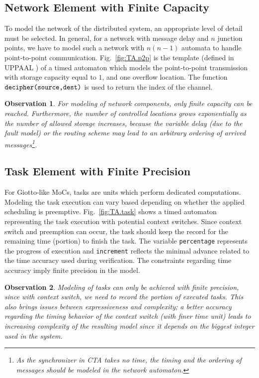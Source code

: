 \documentclass[10pt, a4paper, onecolumn, conference, compsocconf]{IEEEtran}
\newtheorem{obser}{Observation}
\begin{document}
\subsection{Network Element with Finite Capacity\label{sec.Network.Finite.Capacities}}
To model the network of the distributed system, an appropriate level of detail must be selected. In general, for a network with message delay and $n$ junction points, we have to model such a network with $n(n-1)$ automata to handle point-to-point communication. Fig.~\ref{fig:TA.p2p} is the template (defined in UPPAAL \cite{bdl:2004:uppaal}) of a timed automaton  which models the point-to-point transmission with storage capacity equal to $1$, and one overflow location. The function $\verb"decipher(source,dest)"$ is used to return the index of the channel.

\begin{obser}
For modeling of network components, only finite capacity can be reached.
Furthermore, the number of controlled locations grows exponentially as the number of allowed storage increases, because
the variable delay (due to the fault model) or the routing scheme may lead to an arbitrary ordering of arrived messages\footnote{As the
synchronizer in CTA takes no time, the timing and the ordering of messages should be modeled in the network automaton.}.
\end{obser}


\subsection{Task Element with Finite Precision\label{sec.Task.Element.Finite.Precision}}
For Giotto-like MoCs, tasks are units which perform dedicated computations. Modeling the task execution can vary based depending on whether the applied scheduling is preemptive.
Fig.~\ref{fig:TA.task} shows a timed automaton representing the task execution with potential context switches. Since context switch and preemption can occur, the
task should keep the record for the remaining time (portion) to finish the task. The variable \verb"percentage" represents the progress of execution and \verb"increment" reflects the minimal advance related to the time accuracy used during verification. The constraints regarding time accuracy imply finite precision in the model.

\begin{obser}
Modeling of tasks can only be achieved with finite precision, since with context switch, we need to record the portion
of executed tasks. This also brings issues between expressiveness and complexity;
a better accuracy regarding the timing behavior of the context switch (with finer time unit) leads to increasing complexity of the resulting model since it depends on the biggest integer used
in the system.
\end{obser}
\end{document}
